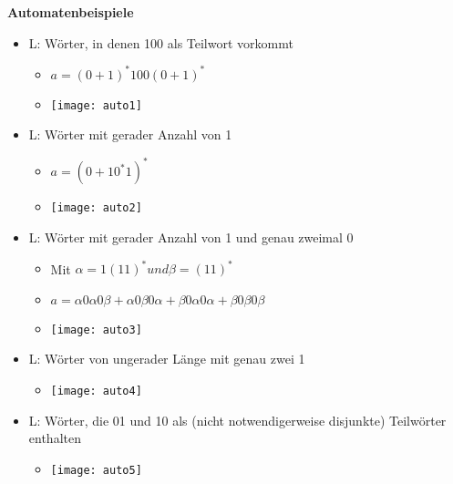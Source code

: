 \pagebreak



{\Large \textbf{Automatenbeispiele}}

\begin{itemize}

\item L: Wörter, in denen 100 als Teilwort vorkommt
	\begin{itemize}
	\item $a = (0+1)^*100(0+1)^*$
	\item[]
		\begin{center}
		\texttt{[image: auto1]}
		\end{center}	
	\end{itemize}

\item L: Wörter mit gerader Anzahl von 1
	\begin{itemize}
	\item $a=(0+10^*1)^*$
	\item[]
		\begin{center}
		\texttt{[image: auto2]}
		\end{center}	
	\end{itemize}
	
\item L: Wörter mit gerader Anzahl von 1 und genau zweimal 0
	\begin{itemize}
	\item Mit $\alpha = 1(11)^* und \beta=(11)^*$
	\item $a = \alpha0\alpha0\beta + \alpha0\beta0\alpha + \beta0\alpha0\alpha + \beta0\beta0\beta$
	\item[]
		\begin{center}
		\texttt{[image: auto3]}
		\end{center}	
	\end{itemize}
	
\item L: Wörter von ungerader Länge mit genau zwei 1
	\begin{itemize}
	\item[]
		\begin{center}
		\texttt{[image: auto4]}
		\end{center}	
	\end{itemize}
	
\item L: Wörter, die 01 und 10 als (nicht notwendigerweise disjunkte) Teilwörter enthalten
	\begin{itemize}
	\item[]
		\begin{center}
		\texttt{[image: auto5]}
		\end{center}	
	\end{itemize}


\end{itemize}
